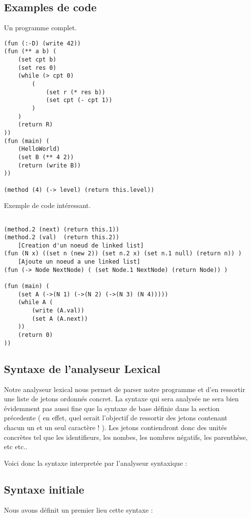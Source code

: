 \subsection{Examples de code}
Un programme complet. 
\begin{verbatim}
(fun (:-D) (write 42))
(fun (** a b) (
	(set cpt b)
	(set res 0)
	(while (> cpt 0) 
		(
			(set r (* res b))
			(set cpt (- cpt 1))	
		)
	)
	(return R)
))
(fun (main) (
	(HelloWorld)
	(set B (** 4 2))
	(return (write B))
))

(method (4) (-> level) (return this.level))

\end{verbatim}
Exemple de code intéressant. 
\begin{verbatim}

(method.2 (next) (return this.1))
(method.2 (val)  (return this.2))
	[Creation d'un noeud de linked list]
(fun (N x) ((set n (new 2)) (set n.2 x) (set n.1 null) (return n)) )
	[Ajoute un noeud a une linked list] 
(fun (-> Node NextNode) ( (set Node.1 NextNode) (return Node)) )

(fun (main) (
	(set A (->(N 1) (->(N 2) (->(N 3) (N 4)))))
	(while A (
		(write (A.val))
		(set A (A.next))
	))
	(return 0)
))
\end{verbatim}

\subsection{Syntaxe de l'analyseur Lexical}

Notre analyseur lexical nous permet de parser notre programme et d'en ressortir une liste de jetons ordonnés concret. 
La syntaxe qui sera analysée ne sera bien évidemment pas aussi fine que la syntaxe de base définie dans la section précedente 
( en effet, quel serait l'objectif de ressortir des jetons contenant chacun un et un seul caractère ! ). 
Les jetons contiendront donc des unités concrètes tel que les identifieurs, les nombes, les nombres négatifs, les parenthèse, etc etc..

Voici donc la syntaxe interpretée par l'analyseur syntaxique :

\subsection{Syntaxe initiale}
Nous avons définit un premier lieu cette syntaxe : 

